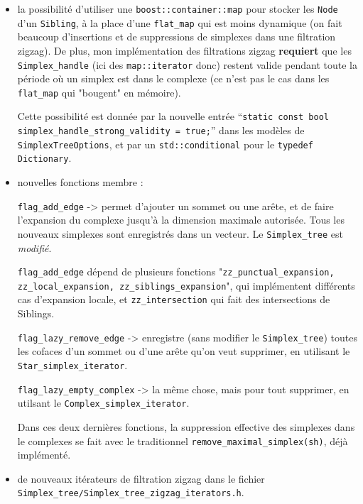 \documentclass[11pt]{amsart}
\numberwithin{equation}{section}
\theoremstyle{plain}
\theoremstyle{definition}
\begin{document}
\begin{itemize}
\item la possibilité d'utiliser une {\tt boost::container::map} pour stocker les {\tt Node} d'un {\tt Sibling}, à la place d'une {\tt flat\_map} qui est moins dynamique (on fait beaucoup d'insertions et de suppressions de simplexes dans une filtration zigzag). De plus, mon implémentation des filtrations zigzag {\bf requiert} que les {\tt Simplex\_handle} (ici des {\tt map::iterator} donc) restent valide pendant toute la période où un simplex est dans le complexe (ce n'est pas le cas dans les {\tt flat\_map} qui "bougent" en mémoire).

Cette possibilité est donnée par la nouvelle entrée ``{\tt static const bool simplex\_handle\_strong\_validity = true;}'' dans les modèles de
{\tt SimplexTreeOptions}, et par un {\tt std::conditional} pour le {\tt typedef Dictionary}.

\item nouvelles fonctions membre :

\medskip

{\tt flag\_add\_edge} -> permet d'ajouter un sommet ou une arête, et de faire l'expansion du complexe jusqu'à la dimension maximale autorisée. Tous les nouveaux simplexes sont enregistrés dans un vecteur. Le {\tt Simplex\_tree} est {\em modifié}.

{\tt flag\_add\_edge} dépend de plusieurs fonctions "{\tt zz\_punctual\_expansion, zz\_local\_expansion, zz\_siblings\_expansion}", qui implémentent différents cas d'expansion locale, et {\tt zz\_intersection} qui fait des intersections de Siblings.

\medskip

{\tt flag\_lazy\_remove\_edge} -> enregistre (sans modifier le {\tt Simplex\_tree}) toutes les cofaces d'un sommet ou d'une arête qu'on veut supprimer, en utilisant le {\tt Star\_simplex\_iterator}.

\medskip

{\tt flag\_lazy\_empty\_complex} -> la même chose, mais pour tout supprimer, en utilsant le {\tt Complex_simplex_iterator}.

\medskip

Dans ces deux dernières fonctions, la suppression effective des simplexes dans le complexes se fait avec le traditionnel {\tt remove_maximal_simplex(sh)}, déjà implémenté.

\item de nouveaux itérateurs de filtration zigzag dans le fichier {\tt Simplex\_tree/Simplex\_tree\_zigzag\_iterators.h}. 


\end{itemize}
\end{document}
